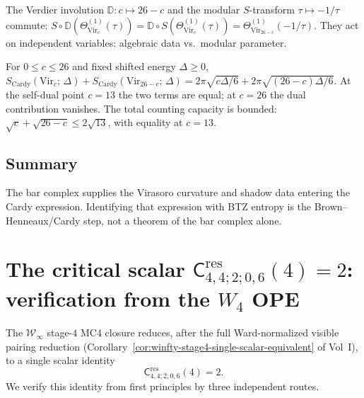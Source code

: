 \documentclass[11pt]{article}
\newcommand{\cW}{\mathcal{W}}
\begin{document}
\begin{proposition}
\label{prop:btz-D-S-commute-wn}
The Verdier involution $\mathbb{D}\colon c \mapsto 26-c$ and the
modular $S$-transform $\tau \mapsto -1/\tau$ commute:
$S \circ \mathbb{D}(\Theta_{\mathrm{Vir}_c}^{(1)}(\tau))
= \mathbb{D} \circ S(\Theta_{\mathrm{Vir}_c}^{(1)}(\tau))
= \Theta_{\mathrm{Vir}_{26-c}}^{(1)}(-1/\tau)$.
They act on independent variables: algebraic data vs.\ modular
parameter.
\end{proposition}

\begin{observation}
\label{thm:btz-paired-cardy-wn}
For $0 \le c \le 26$ and fixed shifted energy $\Delta\ge 0$,
$S_{\mathrm{Cardy}}(\mathrm{Vir}_c;\,\Delta)
+ S_{\mathrm{Cardy}}(\mathrm{Vir}_{26-c};\,\Delta)
= 2\pi\sqrt{c\Delta/6} + 2\pi\sqrt{(26-c)\Delta/6}$.
At the self-dual point $c = 13$ the two terms are equal;
at $c = 26$ the dual contribution vanishes.
The total counting capacity is bounded:
$\sqrt{c} + \sqrt{26-c} \le 2\sqrt{13}$, with equality at
$c = 13$.
\end{observation}

\subsection{Summary}

The bar complex supplies the Virasoro curvature and shadow data
entering the Cardy expression.  Identifying that expression with
BTZ entropy is the Brown--Henneaux/Cardy step, not a theorem of
the bar complex alone.


%
%

\section{The critical scalar
\texorpdfstring{$\mathsf{C}^{\mathrm{res}}_{4,4;2;0,6}(4)=2$}{C\^res\_{4,4;2;0,6}(4)=2}:
verification from the $W_4$ OPE}
\label{sec:critical-scalar-verification}

The $\cW_\infty$ stage-$4$ MC4 closure reduces, after the full Ward-normalized
visible pairing reduction (Corollary~\ref*{cor:winfty-stage4-single-scalar-equivalent}
of Vol~I), to a single scalar identity
\[
\mathsf{C}^{\mathrm{res}}_{4,4;2;0,6}(4)=2.
\]
We verify this identity from first principles by three independent routes.
\end{document}
